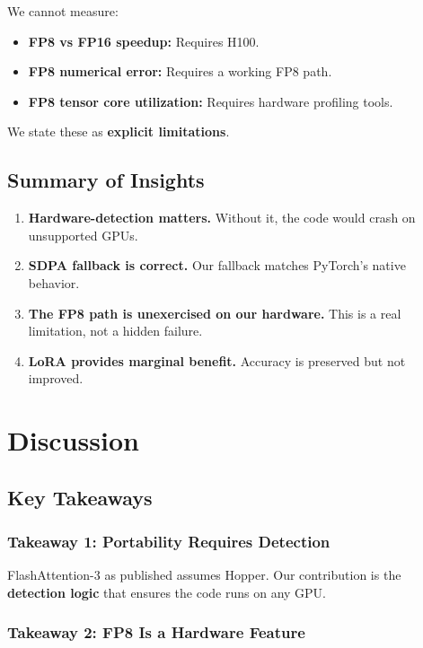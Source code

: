 We cannot measure:

\begin{itemize}
\item \textbf{FP8 vs FP16 speedup:} Requires H100.
\item \textbf{FP8 numerical error:} Requires a working FP8 path.
\item \textbf{FP8 tensor core utilization:} Requires hardware profiling tools.

\end{itemize}
We state these as \textbf{explicit limitations}.

\subsection{Summary of Insights}

\begin{enumerate}
\item \textbf{Hardware-detection matters.} Without it, the code would crash on
  unsupported GPUs.
\item \textbf{SDPA fallback is correct.} Our fallback matches PyTorch's native
  behavior.
\item \textbf{The FP8 path is unexercised on our hardware.} This is a real
  limitation, not a hidden failure.
\item \textbf{LoRA provides marginal benefit.} Accuracy is preserved but not
  improved.

\end{enumerate}



\section{Discussion}

\subsection{Key Takeaways}

\subsubsection{Takeaway 1: Portability Requires Detection}

FlashAttention-3 as published assumes Hopper. Our contribution is the 
\textbf{detection logic} that ensures the code runs on any GPU.

\subsubsection{Takeaway 2: FP8 Is a Hardware Feature}

